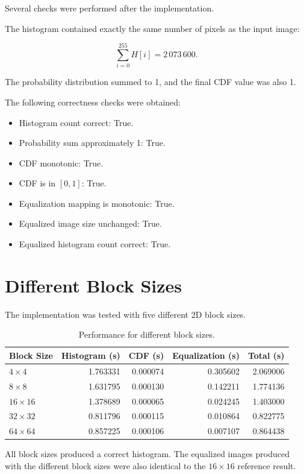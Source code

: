 \documentclass[11pt]{article}
\begin{document}
Several checks were performed after the implementation.

The histogram contained exactly the same number of pixels as the input
image:

\[
\sum_{i=0}^{255} H[i] = 2\,073\,600.
\]

The probability distribution summed to 1, and the final CDF value was also
1.

The following correctness checks were obtained:

\begin{itemize}
    \item Histogram count correct: True.
    \item Probability sum approximately 1: True.
    \item CDF monotonic: True.
    \item CDF is in $[0,1]$: True.
    \item Equalization mapping is monotonic: True.
    \item Equalized image size unchanged: True.
    \item Equalized histogram count correct: True.
\end{itemize}

\section{Different Block Sizes}

The implementation was tested with five different 2D block sizes.

\begin{table}[H]
\centering
\caption{Performance for different block sizes.}
\label{tab:block_results}
\begin{tabular}{lrrrr}
\toprule
Block Size & Histogram (s) & CDF (s) & Equalization (s) & Total (s) \\
\midrule
$4\times4$   & 1.763331 & 0.000074 & 0.305602 & 2.069006 \\
$8\times8$   & 1.631795 & 0.000130 & 0.142211 & 1.774136 \\
$16\times16$ & 1.378689 & 0.000065 & 0.024245 & 1.403000 \\
$32\times32$ & 0.811796 & 0.000115 & 0.010864 & 0.822775 \\
$64\times64$ & 0.857225 & 0.000106 & 0.007107 & 0.864438 \\
\bottomrule
\end{tabular}
\end{table}

All block sizes produced a correct histogram. The equalized images produced
with the different block sizes were also identical to the $16\times16$
reference result.
\end{document}
